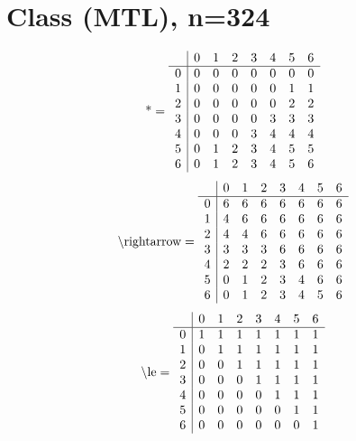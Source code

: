 \documentclass[11pt]{article}
\begin{document}
\section{Class (MTL), n=324}
\[\text{*} = 
\begin{array}{r | r r r r r r r}
 & 0 & 1 & 2 & 3 & 4 & 5 & 6 \\ \hline
0 & 0 & 0 & 0 & 0 & 0 & 0 & 0 \\
1 & 0 & 0 & 0 & 0 & 0 & 1 & 1 \\
2 & 0 & 0 & 0 & 0 & 0 & 2 & 2 \\
3 & 0 & 0 & 0 & 0 & 3 & 3 & 3 \\
4 & 0 & 0 & 0 & 3 & 4 & 4 & 4 \\
5 & 0 & 1 & 2 & 3 & 4 & 5 & 5 \\
6 & 0 & 1 & 2 & 3 & 4 & 5 & 6 \\
\end{array}
\]
\[\text{\textbackslash rightarrow} = 
\begin{array}{r | r r r r r r r}
 & 0 & 1 & 2 & 3 & 4 & 5 & 6 \\ \hline
0 & 6 & 6 & 6 & 6 & 6 & 6 & 6 \\
1 & 4 & 6 & 6 & 6 & 6 & 6 & 6 \\
2 & 4 & 4 & 6 & 6 & 6 & 6 & 6 \\
3 & 3 & 3 & 3 & 6 & 6 & 6 & 6 \\
4 & 2 & 2 & 2 & 3 & 6 & 6 & 6 \\
5 & 0 & 1 & 2 & 3 & 4 & 6 & 6 \\
6 & 0 & 1 & 2 & 3 & 4 & 5 & 6 \\
\end{array}
\]
\[\text{\textbackslash le} = 
\begin{array}{r | r r r r r r r}
 & 0 & 1 & 2 & 3 & 4 & 5 & 6 \\ \hline
0 & 1 & 1 & 1 & 1 & 1 & 1 & 1 \\
1 & 0 & 1 & 1 & 1 & 1 & 1 & 1 \\
2 & 0 & 0 & 1 & 1 & 1 & 1 & 1 \\
3 & 0 & 0 & 0 & 1 & 1 & 1 & 1 \\
4 & 0 & 0 & 0 & 0 & 1 & 1 & 1 \\
5 & 0 & 0 & 0 & 0 & 0 & 1 & 1 \\
6 & 0 & 0 & 0 & 0 & 0 & 0 & 1 \\
\end{array}
\]
\end{document}
